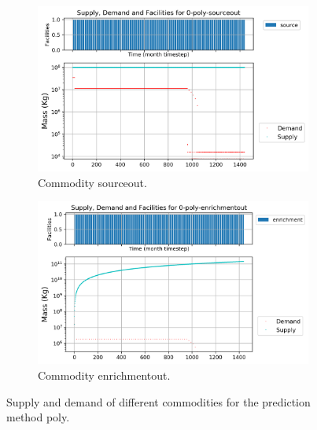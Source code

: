\documentclass[11pt]{article}
\begin{document}
\begin{figure}[!h]
	\centering
	\begin{subfigure}[]{0.45\textwidth}
		\centering
		\includegraphics[width=\linewidth]{29-figures/0-poly-sourceout.png} 
		\caption{Commodity sourceout.}
		\label{fig:29-sourceout}
	\end{subfigure}
	\vspace{1cm}
	\begin{subfigure}[]{0.45\textwidth}
		\centering
		\includegraphics[width=\linewidth]{29-figures/0-poly-enrichmentout.png} 
		\caption{Commodity enrichmentout.}
		\label{fig:29-enrichmentout}
	\end{subfigure}
	\hfill
	\caption{Supply and demand of different commodities for the prediction method poly.}
	\label{fig:29-front}
\end{figure}
\end{document}
